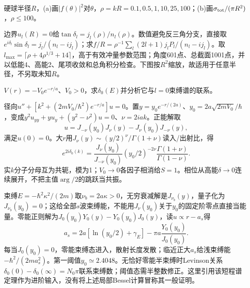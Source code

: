 \begin{exercise}
硬球半径$R$，(a)画$|f(\theta)|^2$对$\theta$，$\rho=kR=0.1,0.5,1,10,25,100$；(b)画$\sigma_{\rm tot}/(\pi R^2)$，$\rho\le100$。
\end{exercise}
\begin{solution}
边界$u_l(R)=0$给$\tan\delta_l=j_l(\rho)/n_l(\rho)$。数值避免反三角分支，直接取$e^{i\delta_l}\sin\delta_l=j_l/(n_l-ij_l)$；求$f/R=\rho^{-1}\sum_l(2l+1)j_lP_l/(n_l-ij_l)$。取$l_{\max}=\lceil\rho+4\rho^{1/3}+14\rceil$，高于有效冲量参数范围；角度601点、总截面1001点，并以低能4、高能2、尾项收敛和总角积分检查。下图按$R^2$缩放，故适用于任意半径，不另取未知$R$。

\end{solution}

\begin{exercise}
$V(r)=-V_0e^{-r/a}$、$V_0>0$，求$\delta_0(E)$并分析它与$l=0$束缚谱的联系。
\end{exercise}
\begin{solution}
径向$u''+[k^2+(2mV_0/\hbar^2)e^{-r/a}]u=0$。置$y=y_0e^{-r/(2a)}$、$y_0=2a\sqrt{2mV_0}/\hbar$，变成$y^2u_{yy}+yu_y+(y^2-\nu^2)u=0$、$\nu=2iak$。正能解取
\[
 u=J_{-\nu}(y_0)J_\nu(y)-J_\nu(y_0)J_{-\nu}(y),
\]
满足$u(0)=0$。大$r$用$J_\nu(y)\sim(y/2)^\nu/\Gamma(1+\nu)$读入/出射比，得
\[
 e^{2i\delta_0(k)}=\frac{J_\nu(y_0)}{J_{-\nu}(y_0)}
 (y_0/2)^{-2\nu}\frac{\Gamma(1+\nu)}{\Gamma(1-\nu)}.
\]
实$k$分子分母互为共轭，模为1；$V_0\to0$各因子相消给$S=1$。相位从高能$\delta\to0$连续展开，不把主值$\arg/2$的跳跃当共振。

束缚$E=-\hbar^2\kappa^2/(2m)$取$\nu_b=2a\kappa>0$，无穷衰减解是$J_{\nu_b}(y)$，量子化为$J_{\nu_b}(y_0)=0$；这给全部$s$波束缚能，不能用$J_\nu(y_0)$关于$y_0$的固定阶零点直接当能量。零能正则解为$J_0(y_0)Y_0(y)-Y_0(y_0)J_0(y)$，读$u\propto r-a_s$得
\[
 a_s=2a[\ln(y_0/2)+\gamma_E]-\pi a\frac{Y_0(y_0)}{J_0(y_0)}.
\]
每当$J_0(y_0)=0$，零能束缚态进入，散射长度发散；临近正大$a_s$给浅束缚能$-\hbar^2/(2ma_s^2)$。第一阈值$y_0\simeq2.4048$。无恰好零能半束缚时Levinson关系$\delta_0(0)-\delta_0(\infty)=N_0\pi$联系束缚数；阈值态需半整数修正。这里引用该短程谱定理作为进阶输入，没有将上述局部Bessel计算冒称其一般证明。
\end{solution}

